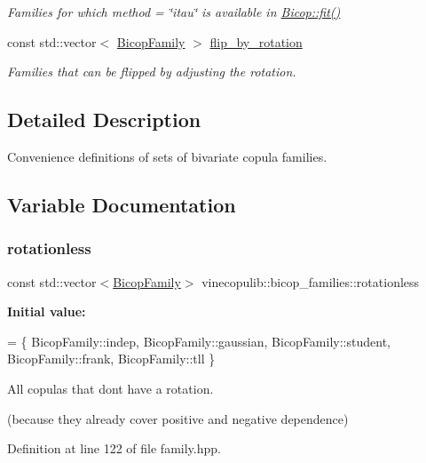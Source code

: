\begin{DoxyCompactItemize}
\begin{DoxyCompactList}\small\item\em Families for which {\ttfamily method = \char`\"{}itau\char`\"{}} is available in \hyperlink{classvinecopulib_1_1_bicop_ac95738f7f2ec4e008404f5621030efc1}{Bicop\+::fit()} \end{DoxyCompactList}\item 
\mbox{\label{namespacevinecopulib_1_1bicop__families_ae1ae1673e3d4a9c57bd9df074e17a3b9}} 
const std\+::vector$<$ \hyperlink{namespacevinecopulib_a42e95cc06d33896199caab0c11ad44f3}{Bicop\+Family} $>$ \hyperlink{namespacevinecopulib_1_1bicop__families_ae1ae1673e3d4a9c57bd9df074e17a3b9}{flip\+\_\+by\+\_\+rotation}
\begin{DoxyCompactList}\small\item\em Families that can be flipped by adjusting the rotation. \end{DoxyCompactList}\end{DoxyCompactItemize}


\subsection{Detailed Description}
Convenience definitions of sets of bivariate copula families. 

\subsection{Variable Documentation}
\mbox{\label{namespacevinecopulib_1_1bicop__families_ac221bc84c32d2836692ed40d89439928}} 
\subsubsection{\texorpdfstring{rotationless}{rotationless}}
{\footnotesize\ttfamily const std\+::vector$<$\hyperlink{namespacevinecopulib_a42e95cc06d33896199caab0c11ad44f3}{Bicop\+Family}$>$ vinecopulib\+::bicop\+\_\+families\+::rotationless}

{\bfseries Initial value\+:}
\begin{DoxyCode}
= \{
    BicopFamily::indep,
    BicopFamily::gaussian,
    BicopFamily::student,
    BicopFamily::frank,
    BicopFamily::tll
\}
\end{DoxyCode}


All copulas that don\textquotesingle{}t have a rotation. 

(because they already cover positive and negative dependence) 

Definition at line 122 of file family.\+hpp.

